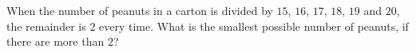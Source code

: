 When the number of peanuts in a carton is divided by $15$, $16$, $17$, $18$, $19$ and $20$, the remainder is $2$ every time. What is the smallest possible number of peanuts, if there are more than $2$?
